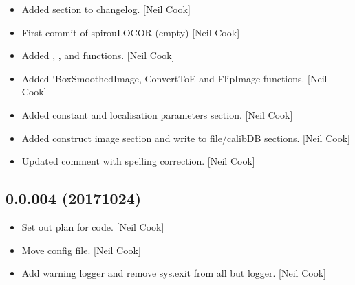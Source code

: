\documentclass[a4paper,10pt,english]{report}
\begin{document}
\begin{itemize}
\item {} 
Added  section to changelog. {[}Neil Cook{]}

\item {} 
First commit of spirouLOCOR (empty) {[}Neil Cook{]}

\item {} 
Added , , and  functions.
{[}Neil Cook{]}

\item {} 
Added ‘BoxSmoothedImage, ConvertToE and FlipImage functions. {[}Neil
Cook{]}

\item {} 
Added  constant and localisation parameters section. {[}Neil
Cook{]}

\item {} 
Added construct image  section and write  to
file/calibDB sections. {[}Neil Cook{]}

\item {} 
Updated comment with spelling correction. {[}Neil Cook{]}

\end{itemize}


\subsection{0.0.004 (2017\sphinxhyphen{}10\sphinxhyphen{}24)}
\label{\detokenize{misc/changelog:id566}}\begin{itemize}
\item {} 
Set out plan for code. {[}Neil Cook{]}

\item {} 
Move config file. {[}Neil Cook{]}

\item {} 
Add warning logger and remove sys.exit from all but logger. {[}Neil
Cook{]}

\end{itemize}
\end{document}
